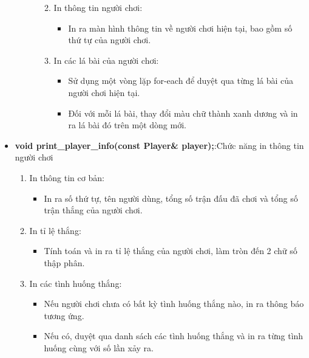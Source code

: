 \documentclass{article}
\begin{document}
\begin{itemize}
\begin{description}
\begin{enumerate}
\begin{itemize}
                \end{itemize}
            \item In thông tin người chơi:
                \begin{itemize}
                    \item In ra màn hình thông tin về người chơi hiện tại, bao gồm số thứ tự của người chơi.
                \end{itemize}
            \item In các lá bài của người chơi:
                \begin{itemize}
                    \item Sử dụng một vòng lặp for-each để duyệt qua từng lá bài của người chơi hiện tại.
                    \item Đối với mỗi lá bài, thay đổi màu chữ thành xanh dương và in ra lá bài đó trên một dòng mới.
                \end{itemize}
        \end{enumerate}
    \end{description}
    
    \item \textbf{void print\_player\_info(const Player\& player);}:Chức năng in thông tin người chơi
    \begin{description}
            \begin{enumerate}
            \item In thông tin cơ bản:
                \begin{itemize}
                    \item In ra số thứ tự, tên người dùng, tổng số trận đấu đã chơi và tổng số trận thắng của người chơi.
                \end{itemize}
            \item In tỉ lệ thắng:
                \begin{itemize}
                    \item Tính toán và in ra tỉ lệ thắng của người chơi, làm tròn đến 2 chữ số thập phân.
                \end{itemize}
            \item In các tình huống thắng:
                \begin{itemize}
                    \item Nếu người chơi chưa có bất kỳ tình huống thắng nào, in ra thông báo tương ứng.
                    \item Nếu có, duyệt qua danh sách các tình huống thắng và in ra từng tình huống cùng với số lần xảy ra.
                \end{itemize}
        \end{enumerate}
    \end{description}
    

\end{itemize}
\end{document}
